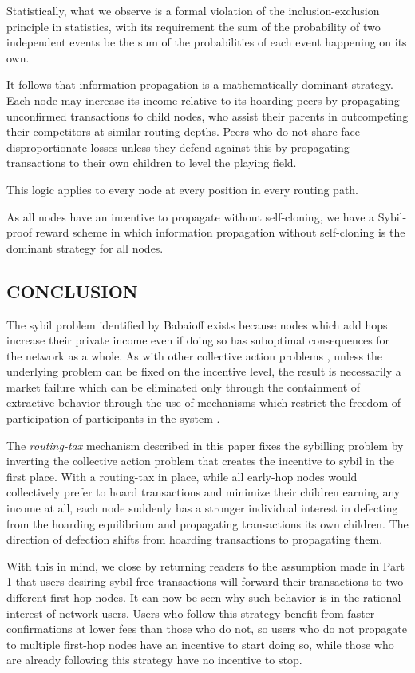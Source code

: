 \documentclass[oneside]{article}   	%
\begin{document}
\begin{multicols}{2}
Statistically, what we observe is a formal violation of the inclusion-exclusion principle in statistics, with its requirement the sum of the probability of two independent events be the sum of the probabilities of each event happening on its own.

It follows that information propagation is a mathematically dominant strategy. Each node may increase its income relative to its hoarding peers by propagating unconfirmed transactions to child nodes, who assist their parents in outcompeting their competitors at similar routing-depths. Peers who do not share face disproportionate losses unless they defend against this by propagating transactions to their own children to level the playing field.

This logic applies to every node at every position in every routing path.

As all nodes have an incentive to propagate without self-cloning, we have a Sybil-proof reward scheme in which information propagation without self-cloning is the dominant strategy for all nodes.


\subsection*{CONCLUSION}

The sybil problem identified by Babaioff exists because nodes which add hops increase their private income even if doing so has suboptimal consequences for the network as a whole. As with other collective action problems \cite{olson1971logic}, unless the underlying problem can be fixed on the incentive level, the result is necessarily a market failure \cite{DBLP:journals/corr/abs-2110-10606} which can be eliminated only through the containment of extractive behavior through the use of mechanisms which restrict the freedom of participation of participants in the system \cite{DBLP:journals/corr/AbrahamMNRS16} \cite{DBLP:journals/corr/abs-1712-07564}.

The \textit{routing-tax} mechanism described in this paper fixes the sybilling problem by inverting the collective action problem that creates the incentive to sybil in the first place. With a routing-tax in place, while all early-hop nodes would collectively prefer to hoard transactions and minimize their children earning any income at all, each node suddenly has a stronger individual interest in defecting from the hoarding equilibrium and propagating transactions its own children. The direction of defection shifts from hoarding transactions to propagating them.

With this in mind, we close by returning readers to the assumption made in Part 1 that users desiring sybil-free transactions will forward their transactions to two different first-hop nodes. It can now be seen why such behavior is in the rational interest of network users. Users who follow this strategy benefit from faster confirmations at lower fees than those who do not, so users who do not propagate to multiple first-hop nodes have an incentive to start doing so, while those who are already following this strategy have no incentive to stop.

\end{multicols} 
\end{document}

